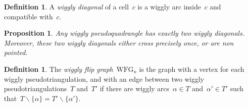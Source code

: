 \documentclass[submission]{FPSAC2025}
\newtheorem{proposition}[theorem]{Proposition}
\theoremstyle{definition}
\newtheorem{definition}[theorem]{Definition}
\newcommand{\ssm}{\smallsetminus} %
\newcommand{\darkblue}{\color{darkblue}} %
\newcommand{\defn}[1]{\textsl{\darkblue #1}} %
\newcommand{\wigglyFlipGraph}{\mathrm{WFG}} %
\begin{document}

\begin{definition}
A \defn{wiggly diagonal} of a cell~$c$ is a wiggly arc inside~$c$ and compatible with~$c$.
\end{definition}

\begin{proposition}
\label{prop:diagonalsPseudoquadrangle}
Any wiggly pseudoquadrangle has exactly two wiggly diagonals.
Moreover, these two wiggly diagonals either cross precisely once, or are non pointed.
\end{proposition}

\begin{definition}
\label{def:wigglyFlipGraph}
The \defn{wiggly flip graph}~$\wigglyFlipGraph_n$ is the graph with a vertex for each wiggly pseudotriangulation, and with an edge between two wiggly pseudotriangulations~$T$ and~$T'$ if there are wiggly arcs~$\alpha \in T$ and~$\alpha' \in T'$ such that~$T \ssm \{\alpha\} = T' \ssm \{\alpha'\}$.
\end{definition}
\end{document}
